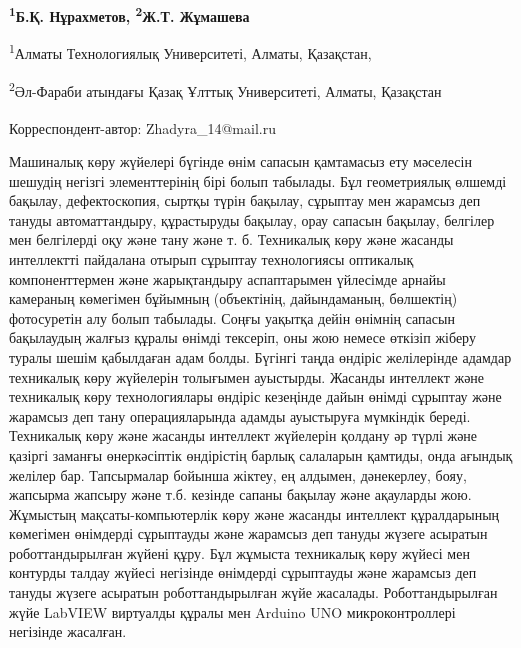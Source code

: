 
\begin{articleheader}

{\bfseries
\textsuperscript{1}Б.Қ. Нұрахметов,
\textsuperscript{2}Ж.Т. Жұмашева\textsuperscript{\envelope }
}
\end{articleheader}

\begin{affiliation}
\textsuperscript{1}Алматы Технологиялық Университеті, Алматы, Қазақстан,

\textsuperscript{2}Әл-Фараби атындағы Қазақ Ұлттық Университеті, Алматы, Қазақстан

\raggedright \textsuperscript{\envelope }Корреспондент-автор: Zhadyra\_14@mail.ru
\end{affiliation}

Машиналық көру жүйелері бүгінде өнім сапасын қамтамасыз ету мәселесін
шешудің негізгі элементтерінің бірі болып табылады. Бұл геометриялық
өлшемді бақылау, дефектоскопия, сыртқы түрін бақылау, сұрыптау мен
жарамсыз деп тануды автоматтандыру, құрастыруды бақылау, орау сапасын
бақылау, белгілер мен белгілерді оқу және тану және т. б. Техникалық
көру және жасанды интеллектті пайдалана отырып сұрыптау технологиясы
оптикалық компоненттермен және жарықтандыру аспаптарымен үйлесімде
арнайы камераның көмегімен бұйымның (объектінің, дайындаманың,
бөлшектің) фотосуретін алу болып табылады. Соңғы уақытқа дейін өнімнің
сапасын бақылаудың жалғыз құралы өнімді тексеріп, оны жою немесе өткізіп
жіберу туралы шешім қабылдаған адам болды. Бүгінгі таңда өндіріс
желілерінде адамдар техникалық көру жүйелерін толығымен ауыстырды.
Жасанды интеллект және техникалық көру технологиялары өндіріс кезеңінде
дайын өнімді сұрыптау және жарамсыз деп тану операцияларында адамды
ауыстыруға мүмкіндік береді. Техникалық көру және жасанды интеллект
жүйелерін қолдану әр түрлі және қазіргі заманғы өнеркәсіптік өндірістің
барлық салаларын қамтиды, онда ағындық желілер бар. Тапсырмалар бойынша
жіктеу, ең алдымен, дәнекерлеу, бояу, жапсырма жапсыру және т.б. кезінде
сапаны бақылау және ақауларды жою. Жұмыстың мақсаты-компьютерлік көру
және жасанды интеллект құралдарының көмегімен өнімдерді сұрыптауды және
жарамсыз деп тануды жүзеге асыратын роботтандырылған жүйені құру. Бұл
жұмыста техникалық көру жүйесі мен контурды талдау жүйесі негізінде
өнімдерді сұрыптауды және жарамсыз деп тануды жүзеге асыратын
роботтандырылған жүйе жасалады. Роботтандырылған жүйе LabVIEW виртуалды
құралы мен Arduino UNO микроконтроллері негізінде жасалған.

